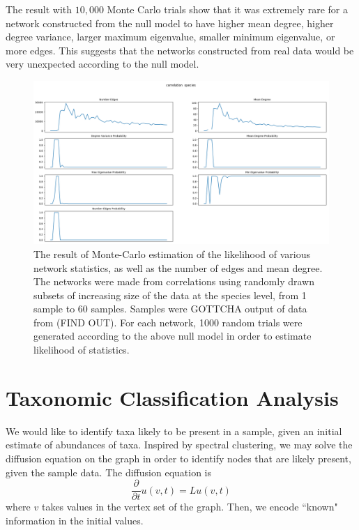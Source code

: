 \documentclass[10pt]{article}
\theoremstyle{definition}
\numberwithin{theorem}{section}
\numberwithin{definition}{section}
\numberwithin{lemma}{section}
\numberwithin{corollary}{section}
\numberwithin{clm}{section}
\numberwithin{rmk}{section}
\begin{document}
The result with $10,000$ Monte Carlo trials show that it was extremely rare for a network constructed from the null model to have higher mean degree, higher degree variance, larger maximum eigenvalue, smaller minimum eigenvalue, or more edges. This suggests that the networks constructed from real data would be very unexpected according to the null model. 
\begin{figure}
	\includegraphics[scale = 0.4]{../../stat_figs/pears_1000__species.png}
	\caption{The result of Monte-Carlo estimation of the likelihood of various network statistics, as well as the number of edges and mean degree. The networks were made from correlations using randomly drawn subsets of increasing size of the data at the species level, from 1 sample to 60 samples. Samples were GOTTCHA output of data from (FIND OUT). For each network, 1000 random trials were generated according to the above null model in order to estimate likelihood of statistics.}\label{montecarlos}
\end{figure}



\section{Taxonomic Classification Analysis}


We would like to identify taxa likely to be present in a sample, given an initial estimate of abundances of taxa. Inspired by spectral clustering, we may solve the diffusion equation on the graph in order to identify nodes that are likely present, given the sample data. The diffusion equation is
\[
\frac{\partial}{\partial t} u(v,t) = L u(v,t)
\]
where $v$ takes values in the vertex set of the graph. Then, we encode ``known" information in the initial values.
\end{document}
